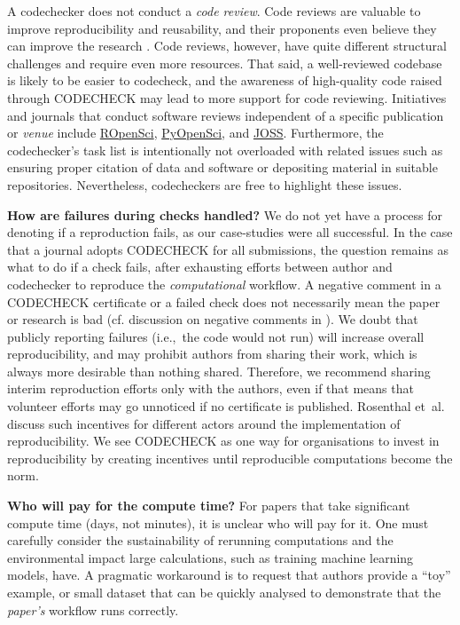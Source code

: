 \documentclass[12pt]{article}
\newcommand{\rev}[1]{\textit{#1}}
\begin{document}
A codechecker does not conduct a \emph{code review}. Code reviews are
valuable to improve reproducibility and reusability, and their
proponents even believe they can improve the research
\cite{petre_code_2014}.  Code reviews, however, have quite different
structural challenges and require even more resources. That said, a
well-reviewed codebase is likely to be easier to codecheck, and the
awareness of high-quality code raised through CODECHECK may lead to
more support for code reviewing.  Initiatives and journals that
conduct software reviews independent of a specific publication or
\rev{venue} include \href{https://ropensci.org/}{ROpenSci}, \href{https://www.pyopensci.org/}{PyOpenSci}, and \href{https://joss.theoj.org}{JOSS}.  Furthermore, the codechecker's task
list is intentionally not overloaded with related issues such as
ensuring proper citation of data and software or depositing material
in suitable repositories. Nevertheless, codecheckers are free to
highlight these issues.

\textbf{How are failures during checks handled?} We do not yet have a process for denoting if a reproduction fails, as our case-studies were all successful.  In the case that a journal
adopts CODECHECK for all submissions, the question remains as what to
do if a check fails, after exhausting efforts between author and
codechecker to reproduce the \rev{computational} workflow.  A negative comment in a
CODECHECK certificate or a failed check does not necessarily mean the
paper or research is bad (cf. discussion on negative comments in
\cite{everythinghertz123}).  We doubt that publicly reporting failures
(i.e.,~the code would not run) will increase overall reproducibility,
and may prohibit authors from sharing their work, which is always more
desirable than nothing shared. Therefore, we recommend sharing interim
reproduction efforts only with the authors, even if that means that volunteer
efforts may go unnoticed if no certificate is published.  
Rosenthal et~al. \cite{Rosenthal2016b} discuss such incentives for
different actors around the implementation of reproducibility. We see
CODECHECK as one way for organisations to invest in reproducibility by
creating incentives until reproducible computations become the norm.

\textbf{Who will pay for the compute time?}  For papers that take
significant compute time (days, not minutes), it is unclear who will
pay for it. One must carefully consider the sustainability of
rerunning computations and the environmental impact large
calculations, such as training machine learning models, have.  A
pragmatic workaround is to request that authors provide a ``toy''
example, or small dataset that can be quickly analysed to demonstrate
that the \rev{paper's} workflow runs correctly.
\end{document}
